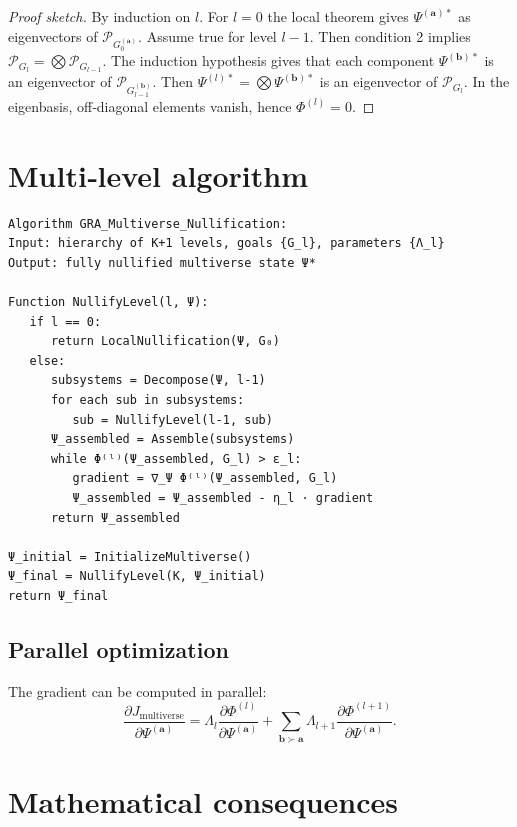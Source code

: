 \documentclass[12pt]{article}
\theoremstyle{definition}
\begin{document}
\begin{proof}[Proof sketch]
By induction on \(l\). For \(l=0\) the local theorem gives \(\Psi^{(\mathbf{a})*}\) as eigenvectors of \(\mathcal{P}_{G_0^{(\mathbf{a})}}\). Assume true for level \(l-1\). Then condition 2 implies \(\mathcal{P}_{G_l} = \bigotimes \mathcal{P}_{G_{l-1}}\). The induction hypothesis gives that each component \(\Psi^{(\mathbf{b})*}\) is an eigenvector of \(\mathcal{P}_{G_{l-1}^{(\mathbf{b})}}\). Then \(\Psi^{(l)*} = \bigotimes \Psi^{(\mathbf{b})*}\) is an eigenvector of \(\mathcal{P}_{G_l}\). In the eigenbasis, off‑diagonal elements vanish, hence \(\Phi^{(l)}=0\).
\end{proof}

\section{Multi‑level algorithm}
\label{sec:algo}

\begin{lstlisting}[caption={Recursive GRA multiverse nullification}, label={alg:rec}]
Algorithm GRA_Multiverse_Nullification:
Input: hierarchy of K+1 levels, goals {G_l}, parameters {Λ_l}
Output: fully nullified multiverse state Ψ*

Function NullifyLevel(l, Ψ):
   if l == 0:
      return LocalNullification(Ψ, G₀)
   else:
      subsystems = Decompose(Ψ, l-1)
      for each sub in subsystems:
         sub = NullifyLevel(l-1, sub)
      Ψ_assembled = Assemble(subsystems)
      while Φ⁽ˡ⁾(Ψ_assembled, G_l) > ε_l:
         gradient = ∇_Ψ Φ⁽ˡ⁾(Ψ_assembled, G_l)
         Ψ_assembled = Ψ_assembled - η_l · gradient
      return Ψ_assembled

Ψ_initial = InitializeMultiverse()
Ψ_final = NullifyLevel(K, Ψ_initial)
return Ψ_final
\end{lstlisting}

\subsection{Parallel optimization}
The gradient can be computed in parallel:
\[
\frac{\partial J_{\text{multiverse}}}{\partial \Psi^{(\mathbf{a})}} = \Lambda_l \frac{\partial \Phi^{(l)}}{\partial \Psi^{(\mathbf{a})}} + \sum_{\mathbf{b}\succ\mathbf{a}} \Lambda_{l+1} \frac{\partial \Phi^{(l+1)}}{\partial \Psi^{(\mathbf{a})}}.
\]

\section{Mathematical consequences}
\label{sec:math}
\end{document}
